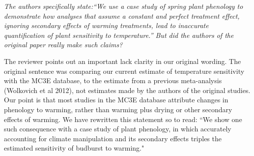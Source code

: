 \documentclass[11pt,a4paper]{letter}
\begin{document}
\emph{The authors specifically state:``We use a case study of spring plant phenology to demonstrate how analyses that assume a constant and perfect treatment effect, ignoring secondary effects of warming treatments, lead to inaccurate quantification of plant sensitivity to temperature.'' But did the authors of the original paper really make such claims?}

The reviewer points out an important lack clarity in our original wording. The original sentence was comparing our current estimate of temperature sensitivity with the MC3E database, to the estimate from a previous meta-analysis (Wolkovich et al 2012), not estimates made by the authors of the original studies.  Our point is that most studies in the MC3E database attribute changes in phenology to warming, rather than warming plus drying or other secondary effects of warming. We have rewritten this statement so to read: ``We show one such consequence with a case study of plant phenology, in which accurately accounting for climate manipulation and its secondary effects triples the estimated sensitivity of budburst to warming."  
\end{document}
